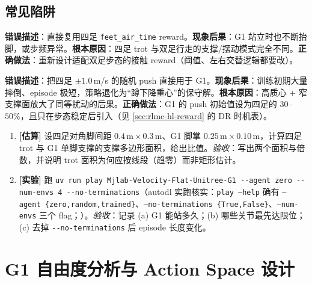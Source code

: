 \subsection{常见陷阱}
\begin{pitfall}
\textbf{错误描述}：直接复用四足 \texttt{feet\_air\_time} reward。\textbf{现象后果}：G1 站立时也不断抬脚，或步频异常。\textbf{根本原因}：四足 trot 与双足行走的支撑/摆动模式完全不同。\textbf{正确做法}：重新设计适配双足步态的接触 reward（阈值、左右交替逻辑都要改）。
\end{pitfall}

\begin{pitfall}
\textbf{错误描述}：把四足 $\pm 1.0$\,m/s 的随机 push 直接用于 G1。\textbf{现象后果}：训练初期大量摔倒、episode 极短，策略退化为“蹲下降重心”的保守解。\textbf{根本原因}：高质心 $+$ 窄支撑面放大了同等扰动的后果。\textbf{正确做法}：G1 的 push 初始值设为四足的 $30$--$50\%$，且只在步态稳定后引入（见 \cref{sec:rlmc-hl-reward} 的 DR 时机表）。
\end{pitfall}

\begin{practice}[本节动手]
\begin{enumerate}
  \item \textbf{[估算]} 设四足对角脚间距 $0.4\,\mathrm{m}\times0.3\,\mathrm{m}$、G1 脚掌 $0.25\,\mathrm{m}\times0.10\,\mathrm{m}$，计算四足 trot 与 G1 单脚支撑的支撑多边形面积，给出比值。\emph{验收}：写出两个面积与倍数，并说明 trot 面积为何应按线段（趋零）而非矩形估计。
  \item \textbf{[实验]} 跑 \verb|uv run play Mjlab-Velocity-Flat-Unitree-G1 --agent zero --num-envs 4 --no-terminations|（autodl 实跑核实：\texttt{play --help} 确有 \texttt{--agent \{zero,random,trained\}}、\texttt{--no-terminations \{True,False\}}、\texttt{--num-envs} 三个 flag；）。\emph{验收}：记录 (a) G1 能站多久；(b) 哪些关节最先达限位；(c) 去掉 \verb|--no-terminations| 后 episode 长度变化。
\end{enumerate}
\end{practice}

\section{G1 自由度分析与 Action Space 设计}\label{sec:rlmc-hl-action}

